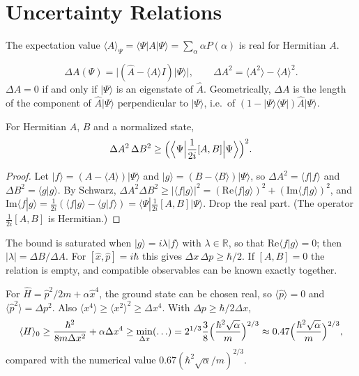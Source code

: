 \section{Uncertainty Relations}

The expectation value $\langle A\rangle_\Psi = \langle\Psi|A|\Psi\rangle = \sum_\alpha\alpha P(\alpha)$ is real for Hermitian $A$.

\begin{definition}[Uncertainty]
\[
    \Delta A(\Psi) = \bigl|(\hat{A}-\langle A\rangle I)|\Psi\rangle\bigr|,
    \qquad
    \Delta A^2 = \langle A^2\rangle - \langle A\rangle^2 .
\]
$\Delta A = 0$ if and only if $|\Psi\rangle$ is an eigenstate of $\hat{A}$. Geometrically, $\Delta A$ is the length of the component of $\hat{A}|\Psi\rangle$ perpendicular to $|\Psi\rangle$, i.e.\ of $(1-|\Psi\rangle\langle\Psi|)\hat{A}|\Psi\rangle$.
\end{definition}

\begin{theorem}
For Hermitian $A$, $B$ and a normalized state,
\[
    \Delta A^2\,\Delta B^2\ge\Bigl(\Bigl\langle\Psi\Bigl|\frac{1}{2i}[A,B]\Bigr|\Psi\Bigr\rangle\Bigr)^2 .
\]
\end{theorem}
\begin{proof}
Let $|f\rangle = (A-\langle A\rangle)|\Psi\rangle$ and $|g\rangle = (B-\langle B\rangle)|\Psi\rangle$, so $\Delta A^2 = \langle f|f\rangle$ and $\Delta B^2 = \langle g|g\rangle$. By Schwarz, $\Delta A^2\Delta B^2\ge|\langle f|g\rangle|^2 = (\mathrm{Re}\langle f|g\rangle)^2 + (\mathrm{Im}\langle f|g\rangle)^2$, and $\mathrm{Im}\langle f|g\rangle = \frac{1}{2i}(\langle f|g\rangle - \langle g|f\rangle) = \langle\Psi|\frac{1}{2i}[A,B]|\Psi\rangle$. Drop the real part. (The operator $\frac{1}{2i}[A,B]$ is Hermitian.)
\end{proof}

The bound is saturated when $|g\rangle = i\lambda|f\rangle$ with $\lambda\in\mathbb{R}$, so that $\mathrm{Re}\langle f|g\rangle = 0$; then $|\lambda| = \Delta B/\Delta A$. For $[\hat{x},\hat{p}] = i\hbar$ this gives $\Delta x\,\Delta p\ge\hbar/2$. If $[A,B] = 0$ the relation is empty, and compatible observables can be known exactly together.

\begin{example}
For $\hat{H} = \hat{p}^2/2m + \alpha\hat{x}^4$, the ground state can be chosen real, so $\langle\hat{p}\rangle = 0$ and $\langle\hat{p}^2\rangle = \Delta p^2$. Also $\langle x^4\rangle\ge\langle x^2\rangle^2\ge\Delta x^4$. With $\Delta p\ge\hbar/2\Delta x$,
\[
    \langle H\rangle_0\ge\frac{\hbar^2}{8m\Delta x^2} + \alpha\Delta x^4\ge\min_{\Delta x}(\ldots) = 2^{1/3}\frac38\Bigl(\frac{\hbar^2\sqrt\alpha}{m}\Bigr)^{2/3}\approx0.47\Bigl(\frac{\hbar^2\sqrt\alpha}{m}\Bigr)^{2/3},
\]
compared with the numerical value $0.67(\hbar^2\sqrt\alpha/m)^{2/3}$.
\end{example}

